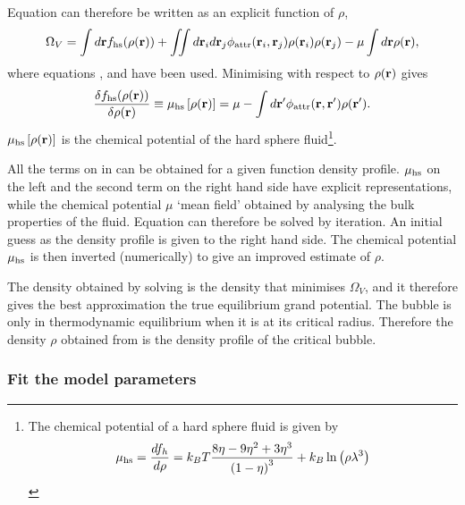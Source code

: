 Equation  can therefore be written as an explicit function of $\rho$,
\begin{align}
   \Omega_V = \int d\textbf{r} f_{\text{hs}}(\rho(\textbf{r}))  +   \iint d \textbf{r}_i d\textbf{r}_j \phi_{\text{attr}}( \textbf{r}_i, \textbf{r}_j) \rho(\textbf{r}_i)\rho(\textbf{r}_j) -  \mu \int d\textbf{r} \rho(\textbf{r}),  \label{eqn:OmegaV}
\end{align}
where equations ,  and  have been used.
Minimising  with respect to $\rho(\textbf{r})$ gives
\begin{align}
  \frac{\delta  f_{\text{hs}}(\rho(\textbf{r})) }{\delta \rho(\textbf{r})} \equiv \mu_{\text{hs}}\left[ \rho(\textbf{r}) \right] = \mu - \int d\textbf{r}^\prime \phi_{\text{attr}}( \textbf{r}, \textbf{r}^\prime) \rho(\textbf{r}^\prime). \label{eqn:ChemPots}
\end{align}
$\mu_{\text{hs}}\left[ \rho(\textbf{r}) \right]$ is the chemical potential of the hard sphere fluid\footnote{
The chemical potential of a hard sphere fluid is given by 
\begin{align}
 \mu_{\text{hs}} = \frac{d f_h}{d \rho} =  k_B T\frac{8\eta - 9 \eta^2 + 3\eta^3}{\left( 1-\eta \right)^3} + k_B \ln \left( \rho \lambda^3 \right)
\end{align}
}.

All the terms on in  can be obtained for a given function density profile.
$\mu_{\text{hs}}$ on the left and the second term on the right hand side have explicit representations, while
the chemical potential $\mu$ `mean field' obtained by analysing the bulk properties of the fluid.
Equation  can therefore be solved by iteration.
An initial guess as the density profile is given to the right hand side.
The chemical potential $\mu_{\text{hs}}$ is then inverted (numerically) to give an improved estimate of $\rho$.

The density obtained by solving  is the density that minimises $\Omega_V$,
and it therefore gives the best approximation the true equilibrium grand potential.
The bubble is only in thermodynamic equilibrium when it is at its critical radius.
Therefore the density $\rho$ obtained from  is the density profile of the critical bubble.

\subsubsection{Fit the model parameters}\label{sec:nuc:DFT:fit}

